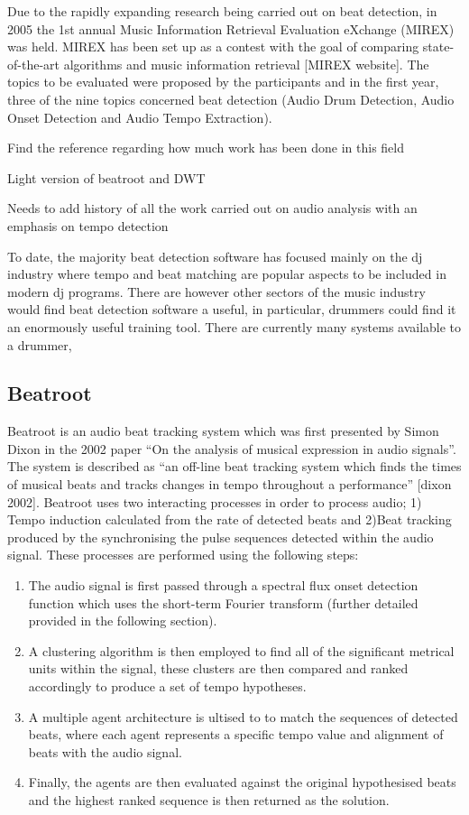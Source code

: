 \documentclass[a4paper, 11pt]{article}
\begin{document}
Due to the rapidly expanding research being carried out on beat detection, in 2005 the 1st annual Music Information Retrieval Evaluation eXchange (MIREX) was held. MIREX has been set up as a contest with the goal of comparing state-of-the-art algorithms and music information retrieval [MIREX website]. The topics to be evaluated were proposed by the participants and in the first year, three of the nine topics concerned beat detection (Audio Drum Detection, Audio Onset Detection and Audio Tempo Extraction).  

Find the reference regarding how much work has been done in this field

Light version of beatroot and DWT

Needs to add history of all the work carried out on audio analysis with an emphasis on tempo detection


To date, the majority beat detection software has focused mainly on the dj industry where tempo and beat matching are popular aspects to be included in modern dj programs. There are however other sectors of the music industry would find beat detection software a useful, in particular, drummers could find it an enormously useful training tool. There are currently many systems available to a drummer, 




\subsection{Beatroot}
Beatroot is an audio beat tracking system which was first presented by Simon Dixon in the 2002 paper ``On the analysis of musical expression in audio signals''. The system is described as ``an off-line beat tracking system which finds the times of musical beats and tracks changes in tempo throughout a performance'' [dixon 2002]. Beatroot uses two interacting processes in order to process audio; 1) Tempo induction calculated from the rate of detected beats and 2)Beat tracking produced by the synchronising the pulse sequences detected within the audio signal. These processes are performed using the following steps:

\begin{enumerate}
\item The audio signal is first passed through a spectral flux onset detection function which uses the short-term Fourier transform (further detailed provided in the following section). 
\item A clustering algorithm is then employed to find all of the significant metrical units within the signal, these clusters are then compared and ranked accordingly to produce a set of tempo hypotheses.
\item A multiple agent architecture is ultised to to match the sequences of detected beats, where each agent represents a specific tempo value and alignment of beats with the audio signal.
\item Finally, the agents are then evaluated against the original hypothesised beats and the highest ranked sequence is then returned as the solution.
\end{enumerate}
\end{document}
